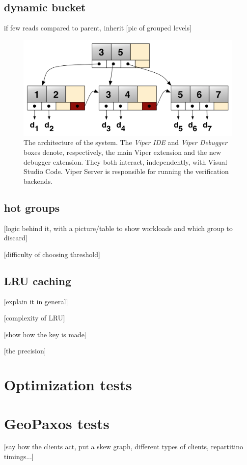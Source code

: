 \subsection{dynamic bucket}\label{sec:variable-size buckets}
if few reads compared to parent, inherit
[pic of grouped levels]
\begin{figure}[htb]
  \centering
  \includegraphics{img/b+tree.png}
  \caption[The architecture of the system]{ The architecture of the system. The
    \textit{Viper IDE} and \textit{Viper Debugger} boxes denote, respectively,
    the main Viper extension and the new debugger extension. They both interact,
    independently, with Visual Studio Code. Viper Server is responsible for
    running the verification backends.}
  \label{fig:b+tree}
\end{figure}

\subsection{hot groups}\label{sec:hot-groups}

[logic behind it, with a picture/table to show workloads and which group to discard]

[difficulty of choosing threshold]

\subsection{LRU caching}\label{sec:LRU caching}
[explain it in general]

[complexity of LRU]

[show how the key is made]

[the precision]

\section{Optimization tests}\label{sec:optimization-tests}

\section{GeoPaxos tests}\label{sec:geopaxos-tests}
[say how the clients act, put a skew graph, different types of clients, repartitino timings...]